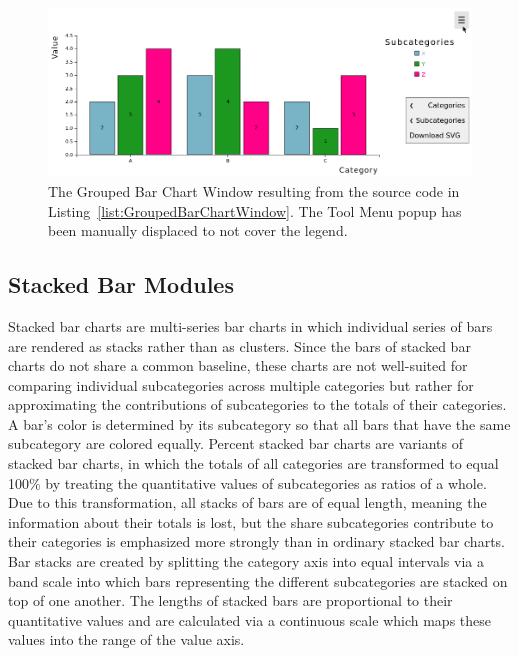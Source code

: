   
\begin{figure}[tp]
\centering
\includegraphics[keepaspectratio,width=\linewidth,height=\fullh]
{images/grouped-bar-chart-window.png}
\caption[Grouped Bar Chart Window Example]{%
The Grouped Bar Chart Window resulting from the source code in
Listing~\ref{list:GroupedBarChartWindow}. The Tool Menu popup has
been manually displaced to not cover the legend.
}
\label{fig:GroupedBarChartWindow}
\end{figure}








\subsection{Stacked Bar Modules}

Stacked bar charts are multi-series bar charts in which individual
series of bars are rendered as stacks rather than as clusters. Since
the bars of stacked bar charts do not share a common baseline, these
charts are not well-suited for comparing individual subcategories
across multiple categories but rather for approximating the
contributions of subcategories to the totals of their categories. A
bar's color is determined by its subcategory so that all bars that
have the same subcategory are colored equally. Percent stacked bar
charts are variants of stacked bar charts, in which the totals of all
categories are transformed to equal 100\% by treating the quantitative
values of subcategories as ratios of a whole. Due to this
transformation, all stacks of bars are of equal length, meaning the
information about their totals is lost, but the share subcategories
contribute to their categories is emphasized more strongly than in
ordinary stacked bar charts. Bar stacks are created by splitting the
category axis into equal intervals via a band scale into which bars
representing the different subcategories are stacked on top of one
another. The lengths of stacked bars are proportional to their
quantitative values and are calculated via a continuous scale which
maps these values into the range of the value axis.



